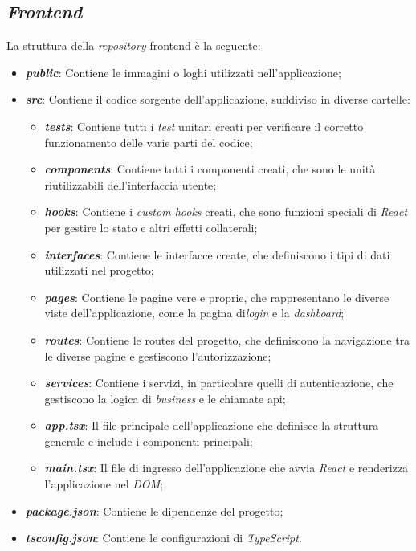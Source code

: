 \subsection{\textit{Frontend}}
\label{sez:frontend}

La struttura della \textit{repository} \gls{frontend} è la seguente:

\begin{itemize}
    \item \textbf{\textit{public}}: Contiene le immagini o loghi utilizzati nell'applicazione;
    \item \textbf{\textit{src}}: Contiene il codice sorgente dell'applicazione, suddiviso in diverse cartelle:
    \begin{itemize}
        \item \textbf{\textit{tests}}: Contiene tutti i \textit{test} unitari creati per verificare il corretto funzionamento delle varie parti del codice;
        \item \textbf{\textit{components}}: Contiene tutti i componenti creati, che sono le unità riutilizzabili dell'interfaccia utente;
        \item \textbf{\textit{hooks}}: Contiene i \textit{custom hooks} creati, che sono funzioni speciali di \textit{React} per gestire lo stato e altri effetti collaterali;
        \item \textbf{\textit{interfaces}}: Contiene le interfacce create, che definiscono i tipi di dati utilizzati nel progetto;
        \item \textbf{\textit{pages}}: Contiene le pagine vere e proprie, che rappresentano le diverse viste dell'applicazione, come la pagina di\textit{login} e la \textit{dashboard};
        \item \textbf{\textit{routes}}: Contiene le routes del progetto, che definiscono la navigazione tra le diverse pagine e gestiscono l'autorizzazione;
        \item \textbf{\textit{services}}: Contiene i servizi, in particolare quelli di autenticazione, che gestiscono la logica di \textit{business} e le chiamate \gls{api};
        \item \textbf{\textit{app.tsx}}: Il file principale dell'applicazione che definisce la struttura generale e include i componenti principali;
        \item \textbf{\textit{main.tsx}}: Il file di ingresso dell'applicazione che avvia \textit{React} e renderizza l'applicazione nel \textit{DOM};
    \end{itemize}
    \item \textbf{\textit{package.json}}: Contiene le dipendenze del progetto;
    \item \textbf{\textit{tsconfig.json}}: Contiene le configurazioni di \textit{TypeScript}.
\end{itemize}

